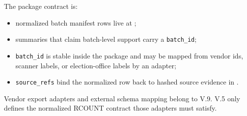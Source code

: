 The package contract is:
\begin{itemize}
\item normalized batch manifest rows live at ;
\item summaries that claim batch-level support carry a \texttt{batch\_id};
\item \texttt{batch\_id} is stable inside the package and may be mapped from
  vendor ids, scanner labels, or election-office labels by an adapter;
\item \texttt{source\_refs} bind the normalized row back to hashed source
  evidence in .
\end{itemize}

Vendor export adapters and external schema mapping belong to V.9. V.5 only
defines the normalized RCOUNT contract those adapters must satisfy.
